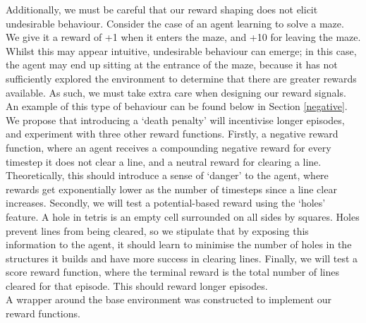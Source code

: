 \documentclass[12pt]{article}
\begin{document}
Additionally, we must be careful that our reward shaping does not elicit undesirable behaviour. Consider the case of an agent learning to solve a maze. We give it a reward of +1 when it enters the maze, and +10 for leaving the maze. Whilst this may appear intuitive, undesirable behaviour can emerge; in this case, the agent may end up sitting at the entrance of the maze, because it has not sufficiently explored the environment to determine that there are greater rewards available. As such, we must take extra care when designing our reward signals. An example of this type of behaviour can be found below in Section \ref{negative}.\\\newline
We propose that introducing a `death penalty' will incentivise longer episodes, and experiment with three other reward functions. Firstly, a negative reward function, where an agent receives a compounding negative reward for every timestep it does not clear a line, and a neutral reward for clearing a line. Theoretically, this should introduce a sense of `danger' to the agent, where rewards get exponentially lower as the number of timesteps since a line clear increases. Secondly, we will test a potential-based reward using the `holes' feature. A hole in tetris is an empty cell surrounded on all sides by squares. Holes prevent lines from being cleared, so we stipulate that by exposing this information to the agent, it should learn to minimise the number of holes in the structures it builds and have more success in clearing lines. Finally, we will test a score reward function, where the terminal reward is the total number of lines cleared for that episode. This should reward longer episodes. \\\newline
A wrapper around the base environment was constructed to implement our reward functions.
\end{document}

